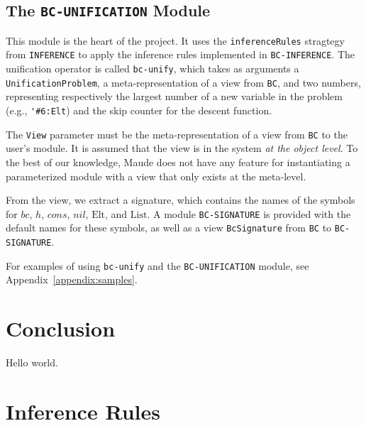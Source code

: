 \documentclass[11pt]{article}
\newcommand{\Elt}{\mathrm{Elt}}
\newcommand{\List}{\mathrm{List}}
\newcommand{\Bc}{\mathit{bc}}
\newcommand{\Hh}{\mathit{h}}
\newcommand{\Cons}{\mathit{cons}}
\newcommand{\Nil}{\mathit{nil}}
\begin{document}
\subsection{The \lstinline|BC-UNIFICATION| Module}\label{subsection:bc-unif-mod}

This module is the heart of the project. It uses the \lstinline|inferenceRules|
stragtegy from \lstinline|INFERENCE| to apply the inference rules implemented
in \lstinline|BC-INFERENCE|. The unification operator is called
\lstinline|bc-unify|, which takes as arguments a
\lstinline|UnificationProblem|, a meta-representation of a view from
\lstinline|BC|, and two numbers, representing respectively the largest number
of a new variable in the problem (e.g., \lstinline|'#6:Elt|) and the skip
counter for the descent function.

The \lstinline|View| parameter must be the meta-representation of a view from
\lstinline|BC| to the user's module. It is assumed that the view is in the
system \emph{at the object level}. To the best of our knowledge, Maude does not
have any feature for instantiating a parameterized module with a view that only
exists at the meta-level.

From the view, we extract a signature, which contains the names of the symbols
for $\Bc$, $\Hh$, $\Cons$, $\Nil$, $\Elt$, and $\List$. A module
\lstinline|BC-SIGNATURE| is provided with the default names for these symbols, as
well as a view \lstinline|BcSignature| from \lstinline|BC| to
\lstinline|BC-SIGNATURE|.

For examples of using \lstinline|bc-unify| and the \lstinline|BC-UNIFICATION|
module, see Appendix~\ref{appendix:samples}.

\section{Conclusion}\label{section:conclusion}

Hello world.

\newpage
\appendix

\section{Inference Rules}\label{appendix:inference}
\end{document}
